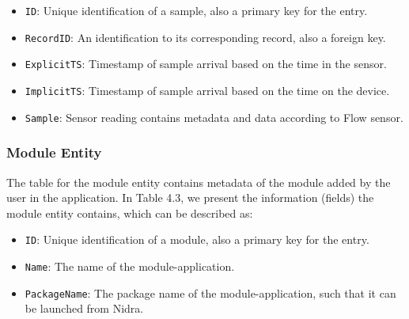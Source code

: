 \begin{itemize}
    \item \verb|ID|: Unique identification of a sample, also a primary key for the entry.
    \item \verb|RecordID|: An identification to its corresponding record, also a foreign key. 
    \item \verb|ExplicitTS|: Timestamp of sample arrival based on the time in the sensor. 
    \item \verb|ImplicitTS|: Timestamp of sample arrival based on the time on the device. 
    \item \verb|Sample|: Sensor reading contains metadata and data according to Flow sensor.
\end{itemize}

\begin{table}[!h]
\begin{center}
\caption{Example entry in the sample table.}
\end{center}
\end{table}



\subsubsection{Module Entity} \label{ssec:module}
The table for the module entity contains metadata of the module added by the user in the application. In Table 4.3, we present the information (fields) the module entity contains, which can be described as:
\begin{itemize}
    \item \verb|ID|: Unique identification of a module, also a primary key for the entry.
    \item \verb|Name|: The name of the module-application.
    \item \verb|PackageName|: The package name of the module-application, such that it can be launched from Nidra. 
\end{itemize}

\begin{table}[!h]
\begin{center}
\caption{Example entry in the module table.}
\end{center}
\end{table}


